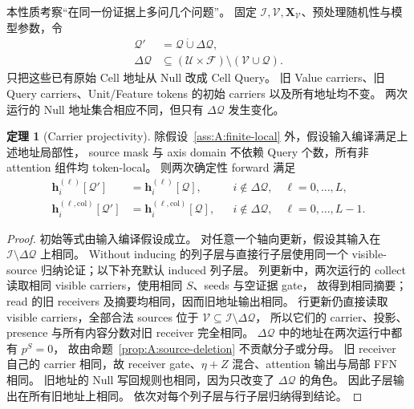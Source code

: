 \documentclass[11pt,UTF8,fontset=fandol]{ctexart}
\numberwithin{equation}{section}
\theoremstyle{definition}
\newtheorem{theorem}[definition]{定理}
\newcommand{\Rset}{\mathcal U}
\newcommand{\Fset}{\mathcal F}
\newcommand{\Vset}{\mathcal V}
\newcommand{\Qset}{\mathcal Q}
\newcommand{\Iset}{\mathcal I}
\begin{document}
本性质考察“在同一份证据上多问几个问题”。
固定 $\Iset,\Vset,\bm X_{\Vset}$、预处理随机性与模型参数，令
\begin{equation}
 \begin{aligned}
  \Qset'&=\Qset\mathbin{\dot\cup}\Delta\Qset,\\
  \Delta\Qset&\subseteq
  (\Rset\times\Fset)\setminus(\Vset\cup\Qset).
 \end{aligned}
 \label{eq:A:query-extension}
\end{equation}
只把这些已有原始 Cell 地址从 Null 改成 Cell Query。
旧 Value carriers、旧 Query carriers、Unit/Feature tokens 的初始 carriers 以及所有地址均不变。
两次运行的 Null 地址集合相应不同，但只有 $\Delta\Qset$ 发生变化。

\begin{theorem}[Carrier projectivity]
\label{thm:A:projectivity}
除假设~\ref{ass:A:finite-local} 外，假设输入编译满足上述地址局部性，
source mask 与 axis domain 不依赖 Query 个数，所有非 attention 组件均 token-local。
则两次确定性 forward 满足
\begin{equation}
 \begin{aligned}
  \bm h_i^{(\ell)}[\Qset']
    &=\bm h_i^{(\ell)}[\Qset],
    &&i\notin\Delta\Qset,\quad \ell=0,\ldots,L,\\
  \bm h_i^{(\ell,\mathrm{col})}[\Qset']
    &=\bm h_i^{(\ell,\mathrm{col})}[\Qset],
    &&i\notin\Delta\Qset,\quad \ell=0,\ldots,L-1.
 \end{aligned}
 \label{eq:A:projectivity}
\end{equation}
\end{theorem}
\begin{proof}
初始等式由输入编译假设成立。
对任意一个轴向更新，假设其输入在 $\Iset\setminus\Delta\Qset$ 上相同。
Without inducing 的列子层与直接行子层使用同一个 visible-source 归纳论证；以下补充默认 induced 列子层。
列更新中，两次运行的 collect 读取相同 visible carriers，使用相同 $S$、seeds 与空证据 gate，
故得到相同摘要；read 的旧 receivers 及摘要均相同，因而旧地址输出相同。
行更新仍直接读取 visible carriers，全部合法 sources 位于 $\Vset\subseteq\Iset\setminus\Delta\Qset$，
所以它们的 carrier、投影、presence 与所有内容分数对旧 receiver 完全相同。
$\Delta\Qset$ 中的地址在两次运行中都有 $p^S=0$，
故由命题~\ref{prop:A:source-deletion} 不贡献分子或分母。
旧 receiver 自己的 carrier 相同，故 receiver gate、$\eta+Z$ 混合、attention 输出与局部 FFN 相同。
旧地址的 Null 写回规则也相同，因为只改变了 $\Delta\Qset$ 的角色。
因此子层输出在所有旧地址上相同。
依次对每个列子层与行子层归纳得到结论。
\end{proof}
\end{document}
